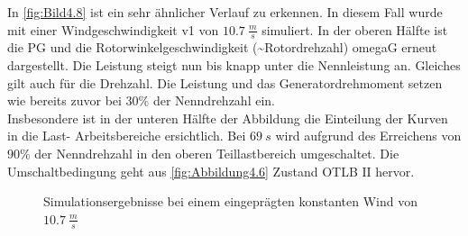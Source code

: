 In \autoref{fig:Bild4.8} ist ein sehr ähnlicher Verlauf zu erkennen. In diesem Fall wurde mit einer Windgeschwindigkeit \acs{v1} von $\SI{10.7}{\frac{m}{s}}$ simuliert. In der oberen Hälfte ist die \ac{PG} und die Rotorwinkelgeschwindigkeit (\sim Rotordrehzahl) \ac{omegaG} erneut dargestellt. Die Leistung steigt nun bis knapp unter die Nennleistung an. Gleiches gilt auch für die Drehzahl. Die Leistung und das Generatordrehmoment setzen wie bereits zuvor bei $30\%$ der Nenndrehzahl ein.\\
Insbesondere ist in der unteren Hälfte der Abbildung die Einteilung der Kurven in die Last- \bzw Arbeitsbereiche ersichtlich. Bei \ca $\SI{69}{s}$ wird aufgrund des Erreichens von $90\%$ der Nenndrehzahl in den oberen Teillastbereich umgeschaltet. Die Umschaltbedingung geht aus \autoref{fig:Abbildung4.6} Zustand OTLB $\mathrm{II}$ hervor.

\begin{figure}[H]
   \centering
   \caption[Simulationsergebnisse moderater konstanter Wind]{Simulationsergebnisse bei einem eingeprägten konstanten Wind von $\SI{10.7}{\frac{m}{s}}$}
   \label{fig:Bild4.8}
\end{figure}

